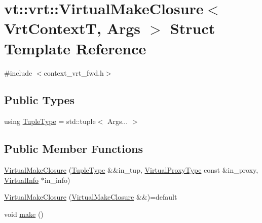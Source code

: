 \hypertarget{structvt_1_1vrt_1_1_virtual_make_closure}{}\section{vt\+:\+:vrt\+:\+:Virtual\+Make\+Closure$<$ Vrt\+ContextT, Args $>$ Struct Template Reference}
\label{structvt_1_1vrt_1_1_virtual_make_closure}


{\ttfamily \#include $<$context\+\_\+vrt\+\_\+fwd.\+h$>$}

\subsection*{Public Types}
\begin{DoxyCompactItemize}
\item 
using \hyperlink{structvt_1_1vrt_1_1_virtual_make_closure_a19b5a051873fa150d9e8ef778fa8afb2}{Tuple\+Type} = std\+::tuple$<$ Args... $>$
\end{DoxyCompactItemize}
\subsection*{Public Member Functions}
\begin{DoxyCompactItemize}
\item 
\hyperlink{structvt_1_1vrt_1_1_virtual_make_closure_a938686b8988330e10f83640b8175df3a}{Virtual\+Make\+Closure} (\hyperlink{structvt_1_1vrt_1_1_virtual_make_closure_a19b5a051873fa150d9e8ef778fa8afb2}{Tuple\+Type} \&\&in\+\_\+tup, \hyperlink{namespacevt_a1b417dd5d684f045bb58a0ede70045ac}{Virtual\+Proxy\+Type} const \&in\+\_\+proxy, \hyperlink{structvt_1_1vrt_1_1_virtual_info}{Virtual\+Info} $\ast$in\+\_\+info)
\item 
\hyperlink{structvt_1_1vrt_1_1_virtual_make_closure_a04ecd116e579c40931845d0bd218ebce}{Virtual\+Make\+Closure} (\hyperlink{structvt_1_1vrt_1_1_virtual_make_closure}{Virtual\+Make\+Closure} \&\&)=default
\item 
void \hyperlink{structvt_1_1vrt_1_1_virtual_make_closure_a28cb61bff1675ac0d0ebffa1869bcaae}{make} ()
\end{DoxyCompactItemize}
